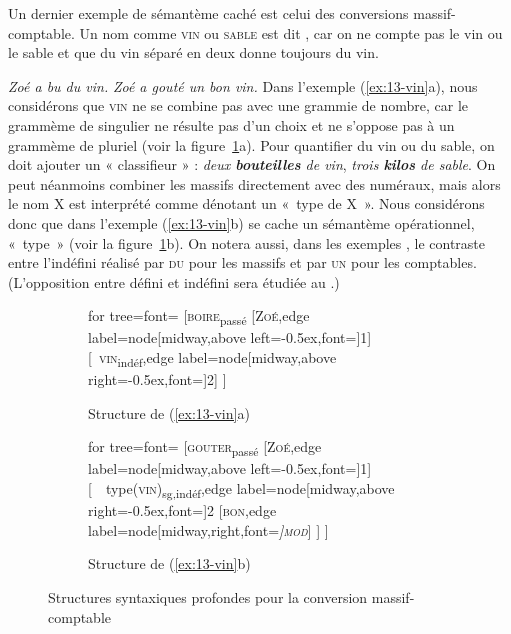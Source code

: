 Un dernier exemple de sémantème caché est celui des conversions massif-comptable. Un nom comme \textsc{vin} ou \textsc{sable} est dit , car on ne compte pas le vin ou le sable et que du vin séparé en deux donne toujours du vin.

\ea\label{ex:13-vin}
\ea \textit{Zoé a bu du vin.}
\ex \textit{Zoé a gouté un bon vin.}\z\z
Dans l’exemple (\ref{ex:13-vin}a), nous considérons que \textsc{vin} ne se combine pas avec une grammie de nombre, car le grammème de singulier ne résulte pas d’un choix et ne s’oppose pas à un grammème de pluriel (voir la figure~\ref{fig:13-vin}a). Pour quantifier du vin ou du sable, on doit ajouter un « classifieur » : \textit{deux \textbf{bouteilles} de vin}, \textit{trois \textbf{kilos} de sable}. On peut néanmoins combiner les massifs directement avec des numéraux, mais alors le nom X est interprété comme dénotant un «~type de X~». Nous considérons donc que dans l’exemple (\ref{ex:13-vin}b) se cache un sémantème opérationnel, «~type~» (voir la figure~\ref{fig:13-vin}b). On notera aussi, dans les exemples , le contraste entre l’indéfini réalisé par \textsc{du} pour les massifs et par \textsc{un} pour les comptables. (L'opposition entre défini et indéfini sera étudiée au .)


\begin{figure}[H]
	\begin{subfigure}[b]{0.5\textwidth}
		\centering
		\begin{forest} for tree={font=\normalfont}
			[\textsc{boire}\textsubscript{passé}
				[\textsc{Zoé},edge label={node[midway,above left=-0.5ex,font=\footnotesize]{1}}]
				[\ \textsc{vin}\textsubscript{indéf},edge label={node[midway,above right=-0.5ex,font=\footnotesize]{2}}]
			]
		\end{forest}
		\caption{Structure de (\ref{ex:13-vin}a)}
	\end{subfigure}%
	\hfill
	\begin{subfigure}[b]{0.5\textwidth}
		\centering
		\begin{forest} for tree={font=\normalfont}
			[\textsc{gouter}\textsubscript{passé}
				[\textsc{Zoé},edge label={node[midway,above left=-0.5ex,font=\footnotesize]{1}}]
				[\ \ type(\textsc{vin})\textsubscript{sg,indéf},edge label={node[midway,above right=-0.5ex,font=\footnotesize]{2}}
					[\textsc{bon},edge label={node[midway,right,font=\footnotesize\itshape]{\textsc{mod}}}]
				]
			]
		\end{forest}
		\caption{Structure de (\ref{ex:13-vin}b)}
	\end{subfigure}
\caption{Structures syntaxiques profondes pour la conversion massif-comptable\label{fig:13-vin}}
\end{figure}

